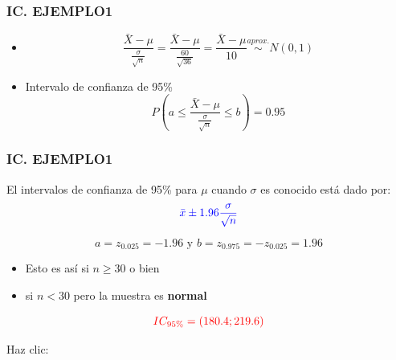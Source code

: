 \documentclass{beamer}
\begin{document}
\begin{frame}
\frametitle{IC. EJEMPLO1}
\begin{itemize}

\item $$\frac{\bar{X}-\mu}{\frac{\sigma}{\sqrt{n}}}=\frac{\bar{X}-\mu}{\frac{60}{\sqrt{36}}}=\frac{\bar{X}-\mu}{10} \stackrel{aprox.}\sim N(0,1)$$
\item Intervalo de confianza de 95\%
$$P(a\leq \frac{\bar{X}-\mu}{\frac{\sigma}{\sqrt{n}}}\leq b)=0.95$$
\end{itemize}
\end{frame}




\begin{frame}
\frametitle{IC. EJEMPLO1}

El intervalos de confianza de 95\% para $\mu$ cuando $\sigma$ es conocido está dado por:
$$\color{blue}{\bar{x} \pm 1.96\frac{\sigma}{\sqrt{n}}}$$

$$a=z_{0.025}=-1.96 \text{ y } b=z_{0.975}=-z_{0.025}=1.96$$
\begin{itemize}
\item Esto es así si $n\geq 30$ o bien
\item si $n<30$ pero la muestra es \textbf{normal}
\end{itemize}


$$\color{red}{IC_{95\%}=(180.4;219.6})$$

      Haz clic: \href{https://colab.research.google.com/drive/14izMe-eFdclOhTeS3hiLE_0h_4E3Jkps?usp=sharing}{} \href{https://docs.google.com/spreadsheets/d/1xAh-TitIncHH8uwblbpvgjYma7B6gUTWlk8C2z1BquQ/edit?usp=sharing}{}
\end{frame}




\end{document}
